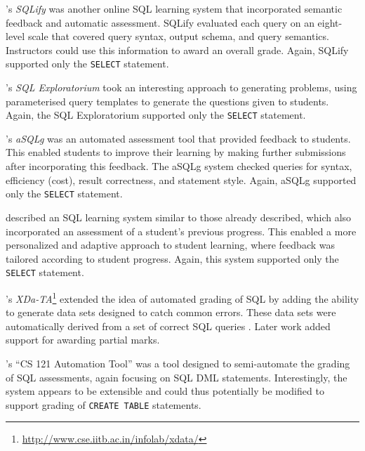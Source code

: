 \documentclass[sigconf, authordraft, capitalise]{acmart}
\begin{document}
\citeauthor{Dekeyser.S-2007a-Computer}'s \emph{SQLify} \cite{Dekeyser.S-2007a-Computer} was another online SQL learning system that incorporated semantic feedback and automatic assessment. SQLify evaluated each query on an eight-level scale that covered query syntax, output schema, and query semantics. Instructors could use this information to award an overall grade. Again, SQLify supported only the \texttt{SELECT} statement.

\citeauthor{Brusilovsky.P-2010a-Learning}'s \emph{SQL Exploratorium} \cite{Brusilovsky.P-2010a-Learning} took an interesting approach to generating problems, using parameterised query templates to generate the questions given to students. Again, the SQL Exploratorium supported only the \texttt{SELECT} statement.

\citeauthor{Kleiner.C-2013a-Automated}'s \emph{aSQLg} \cite{Kleiner.C-2013a-Automated} was an automated assessment tool that provided feedback to students. This enabled students to improve their learning by making further submissions after incorporating this feedback. The aSQLg system checked queries for syntax, efficiency (cost), result correctness, and statement style. Again, aSQLg supported only the \texttt{SELECT} statement.

\citeauthor{Kenny.C-2005a-Automated} \cite{Kenny.C-2005a-Automated} described an SQL learning system similar to those already described, which also incorporated an assessment of a student's previous progress. This enabled a more personalized and adaptive approach to student learning, where feedback was tailored according to student progress. Again, this system supported only the \texttt{SELECT} statement.

\citeauthor{Bhangdiya.A-2015a-XDa-TA}'s \emph{XDa-TA}\footnote{\url{http://www.cse.iitb.ac.in/infolab/xdata/}} extended the idea of automated grading of SQL by adding the ability to generate data sets designed to catch common errors. These data sets were automatically derived from a set of correct SQL queries \cite{Bhangdiya.A-2015a-XDa-TA,Chandra.B-2015a-Data}. Later work \cite{Chandra.B-2016a-Partial} added support for awarding partial marks.

\citeauthor{Gong.A-2015a-CS-121-Automation}'s ``CS 121 Automation Tool'' \cite{Gong.A-2015a-CS-121-Automation} was a tool designed to semi-automate the grading of SQL assessments, again focusing on SQL DML statements. Interestingly, the system appears to be extensible and could thus potentially be modified to support grading of \texttt{CREATE TABLE} statements.
\end{document}
